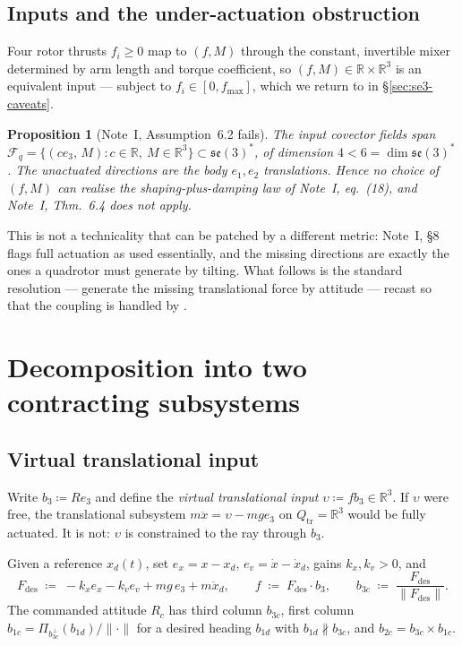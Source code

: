 \documentclass[11pt,a4paper]{article}
\newcommand{\Rm}{\mathbb{R}}
\newcommand{\norm}[1]{\lVert #1 \rVert}
\newcommand{\se}{\mathfrak{se}(3)}
\theoremstyle{plain}
\newtheorem{proposition}[theorem]{Proposition}
\theoremstyle{definition}
\theoremstyle{remark}
\begin{document}
\subsection{Inputs and the under-actuation obstruction}

Four rotor thrusts $f_i\ge0$ map to $(f,M)$ through the constant, invertible mixer
determined by arm length and torque coefficient, so $(f,M)\in\Rm\times\Rm^3$ is an
equivalent input --- subject to $f_i\in[0,f_{\max}]$, which we return to in
\S\ref{sec:se3-caveats}.

\begin{proposition}[Note~I, Assumption~6.2 fails]
\label{prop:underact}
The input covector fields span
$\mathcal{F}_q = \{(ce_3,\,M) : c\in\Rm,\ M\in\Rm^3\} \subset \se^{*}$, of dimension
$4 < 6 = \dim\se^{*}$. The unactuated directions are the body $e_1,e_2$
translations. Hence no choice of $(f,M)$ can realise the shaping-plus-damping law
of Note~I, eq.~(18), and Note~I, Thm.~6.4 does not apply.
\end{proposition}

This is not a technicality that can be patched by a different metric: Note~I,
\S8 flags full actuation as used essentially, and the missing directions are
exactly the ones a quadrotor must generate by tilting. What follows is the
standard resolution --- generate the missing translational force by attitude ---
recast so that the coupling is handled by \cite[Lem.~3.2]{SB13}.

\section{Decomposition into two contracting subsystems}
\label{sec:se3-decomp}

\subsection{Virtual translational input}

Write $b_3 \coloneqq Re_3$ and define the \emph{virtual translational input}
$\upsilon \coloneqq f b_3 \in \Rm^3$. If $\upsilon$ were free, the translational
subsystem $m\ddot x = \upsilon - mge_3$ on $Q_{\mathrm{tr}} = \Rm^3$ would be fully
actuated. It is not: $\upsilon$ is constrained to the ray through $b_3$.

Given a reference $x_d(t)$, set $e_x = x-x_d$, $e_v = \dot x - \dot x_d$, gains
$k_x,k_v>0$, and
\begin{equation}
  F_{\mathrm{des}} \;\coloneqq\; -k_xe_x - k_ve_v + mg\,e_3 + m\ddot x_d,
  \qquad
  f \;\coloneqq\; F_{\mathrm{des}}\cdot b_3,
  \qquad
  b_{3c} \;\coloneqq\; \frac{F_{\mathrm{des}}}{\norm{F_{\mathrm{des}}}} .
  \label{eq:Fdes}
\end{equation}
The commanded attitude $R_c$ has third column $b_{3c}$, first column
$b_{1c} = \Pi_{b_{3c}^{\perp}}(b_{1d})/\norm{\cdot}$ for a desired heading $b_{1d}$
with $b_{1d}\not\parallel b_{3c}$, and $b_{2c}=b_{3c}\times b_{1c}$.
\end{document}
